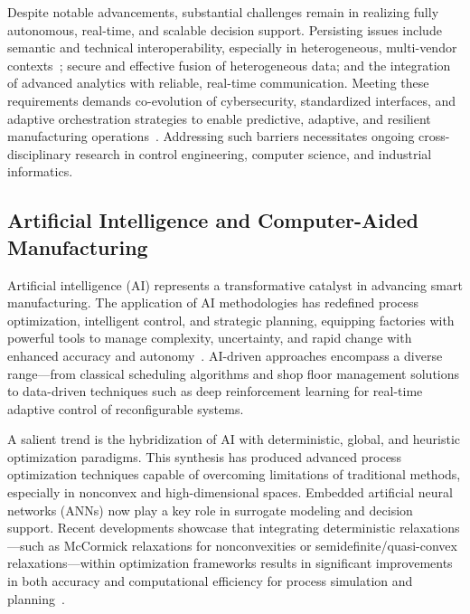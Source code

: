 \documentclass[sigconf]{acmart}
\begin{document}
Despite notable advancements, substantial challenges remain in realizing fully autonomous, real-time, and scalable decision support. Persisting issues include semantic and technical interoperability, especially in heterogeneous, multi-vendor contexts~\cite{ref25}; secure and effective fusion of heterogeneous data; and the integration of advanced analytics with reliable, real-time communication. Meeting these requirements demands co-evolution of cybersecurity, standardized interfaces, and adaptive orchestration strategies to enable predictive, adaptive, and resilient manufacturing operations~\cite{ref4,ref91}. Addressing such barriers necessitates ongoing cross-disciplinary research in control engineering, computer science, and industrial informatics.

\subsection{Artificial Intelligence and Computer-Aided Manufacturing}

Artificial intelligence (AI) represents a transformative catalyst in advancing smart manufacturing. The application of AI methodologies has redefined process optimization, intelligent control, and strategic planning, equipping factories with powerful tools to manage complexity, uncertainty, and rapid change with enhanced accuracy and autonomy~\cite{ref2,ref6,ref13,ref14,ref19,ref20,ref27,ref30,ref37,ref38,ref41,ref42,ref44,ref45,ref50,ref52,ref56,ref72,ref91}. AI-driven approaches encompass a diverse range—from classical scheduling algorithms and shop floor management solutions to data-driven techniques such as deep reinforcement learning for real-time adaptive control of reconfigurable systems.

A salient trend is the hybridization of AI with deterministic, global, and heuristic optimization paradigms. This synthesis has produced advanced process optimization techniques capable of overcoming limitations of traditional methods, especially in nonconvex and high-dimensional spaces. Embedded artificial neural networks (ANNs) now play a key role in surrogate modeling and decision support. Recent developments showcase that integrating deterministic relaxations—such as McCormick relaxations for nonconvexities or semidefinite/quasi-convex relaxations—within optimization frameworks results in significant improvements in both accuracy and computational efficiency for process simulation and planning~\cite{ref71,ref72,ref73,ref76,ref78}.
\end{document}
